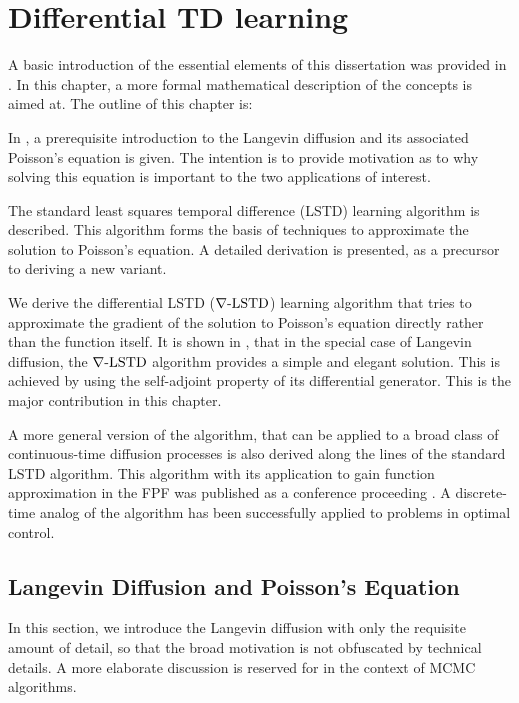 \chapter{Differential TD learning} %
\label{ch:diff_td}
A basic introduction of the essential elements of this dissertation was provided in . In this chapter, a more formal mathematical description of the concepts is aimed at. The outline of this chapter is:
\begin{romannum}
\item In , a prerequisite introduction to the Langevin diffusion and its associated Poisson's equation is given. The intention is to provide motivation as to why solving this equation is important to the two applications of interest.
\item The standard least squares temporal difference (LSTD) learning algorithm is described. This algorithm forms the basis of techniques to approximate the solution to Poisson's equation. A detailed derivation is presented, as a precursor to deriving a new variant.
\item We derive the differential LSTD ($\nabla\text{-LSTD}$) learning algorithm that tries to approximate the gradient of the solution to Poisson's equation directly rather than the function itself.
It is shown in , that in the special case of Langevin diffusion, the $\nabla\text{-LSTD}$ algorithm provides a simple and elegant solution. This is achieved by using the self-adjoint property of its differential generator. This is the major contribution in this chapter. 
\item A more general version of the algorithm, that can be applied to a broad class of continuous-time diffusion processes is also derived along the lines of the standard LSTD algorithm. This algorithm with its application to gain function approximation in the FPF was published as a conference proceeding \cite{raddevmey16}. A discrete-time analog of the algorithm has been successfully applied to problems in optimal control. 
\end{romannum}

\section{Langevin Diffusion and Poisson's Equation}
\label{s:langevin_diffusion}
In this section, we introduce the Langevin diffusion with only the requisite amount of detail, so that the broad motivation is not obfuscated by technical details. A more elaborate discussion is reserved for  in the context of MCMC algorithms. %

